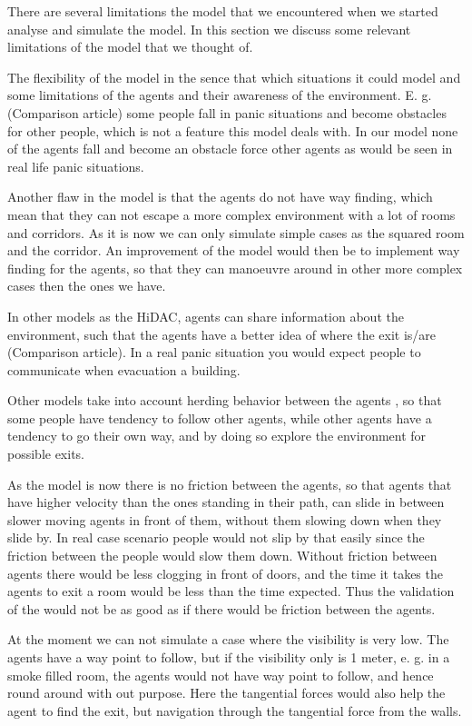 There are several limitations the model that we encountered when we started 
analyse and simulate the model. In this section we discuss some relevant 
limitations of the model that we thought of.

The flexibility of the model in the sence that which situations it could model 
and some limitations of the agents and their awareness of the environment.
E. g. (Comparison article) some people fall in panic situations and become 
obstacles for other people, which is not a feature this model deals with. In 
our model none of the agents fall and become an obstacle force other agents as 
would be seen in real life panic situations.

Another flaw in the model is that the agents do not have way finding, which 
mean that they can not escape a more complex environment with a lot of rooms 
and corridors. As it is now we can only simulate simple cases as the squared 
room and the corridor.  An improvement of the model would then be to implement 
way finding for the agents, so that they can manoeuvre around in other more 
complex cases then the ones we have.

In other models as the HiDAC, agents can share information about the 
environment, such that the agents have a better idea of where the exit is/are 
(Comparison article). In a real panic situation you would expect people to 
communicate when evacuation a building.

Other models take into account herding behavior between the agents  
\cite{helbing00}, so that some people have tendency to follow other agents, 
while other agents have a tendency to go their own way,  and by doing so 
explore the environment for possible exits.

As the model is now there is no friction between the agents, so that agents 
that have higher velocity than the ones standing in their path, can slide in 
between slower moving agents in front of them, without them slowing down when 
they slide by. In real case scenario people would not slip by that easily 
since the friction between the people would slow them down.  Without friction 
between agents there would be less clogging in front of doors, and the time it 
takes the agents to exit a room would be less than the time expected. Thus the 
validation of the would not be as good as if there would be friction between 
the agents.

At the moment we can not simulate a case where the visibility is very low. The 
agents have a way point to follow, but if the visibility only is 1 meter, e. 
g. in a smoke filled room, the  agents would not have way point to follow, and 
hence round around with out purpose. Here the tangential forces would also 
help the agent to find the exit, but navigation through the tangential force 
from the walls.

